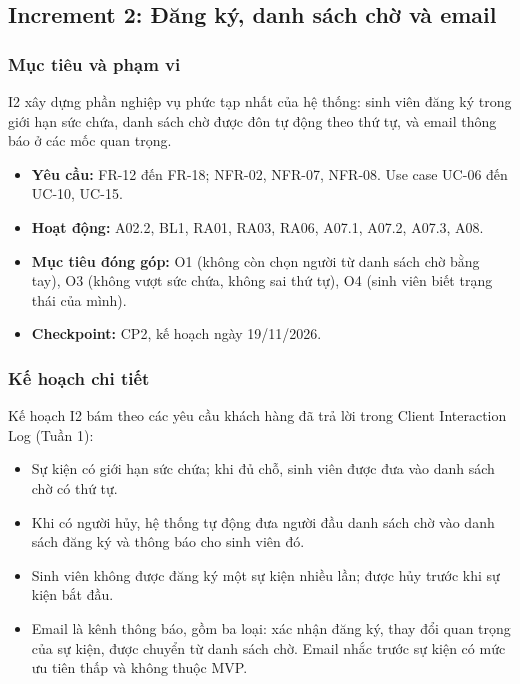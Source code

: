 \subsection{Increment 2: Đăng ký, danh sách chờ và email}
\label{sec:i2}

\subsubsection{Mục tiêu và phạm vi}

I2 xây dựng phần nghiệp vụ phức tạp nhất của hệ thống: sinh viên đăng ký trong giới hạn sức chứa, danh sách chờ được đôn tự động theo thứ tự, và email thông báo ở các mốc quan trọng.

\begin{itemize}
    \item \textbf{Yêu cầu:} FR-12 đến FR-18; NFR-02, NFR-07, NFR-08. Use case UC-06 đến UC-10, UC-15.
    \item \textbf{Hoạt động:} A02.2, BL1, RA01, RA03, RA06, A07.1, A07.2, A07.3, A08.
    \item \textbf{Mục tiêu đóng góp:} O1 (không còn chọn người từ danh sách chờ bằng tay), O3 (không vượt sức chứa, không sai thứ tự), O4 (sinh viên biết trạng thái của mình).
    \item \textbf{Checkpoint:} CP2, kế hoạch ngày 19/11/2026.
\end{itemize}

\subsubsection{Kế hoạch chi tiết}
\label{sec:t3-lower}

Kế hoạch I2 bám theo các yêu cầu khách hàng đã trả lời trong Client Interaction Log (Tuần 1):
\begin{itemize}
    \item Sự kiện có giới hạn sức chứa; khi đủ chỗ, sinh viên được đưa vào danh sách chờ có thứ tự.
    \item Khi có người hủy, hệ thống tự động đưa người đầu danh sách chờ vào danh sách đăng ký và thông báo cho sinh viên đó.
    \item Sinh viên không được đăng ký một sự kiện nhiều lần; được hủy trước khi sự kiện bắt đầu.
    \item Email là kênh thông báo, gồm ba loại: xác nhận đăng ký, thay đổi quan trọng của sự kiện, được chuyển từ danh sách chờ. Email nhắc trước sự kiện có mức ưu tiên thấp và không thuộc MVP.
\end{itemize}

